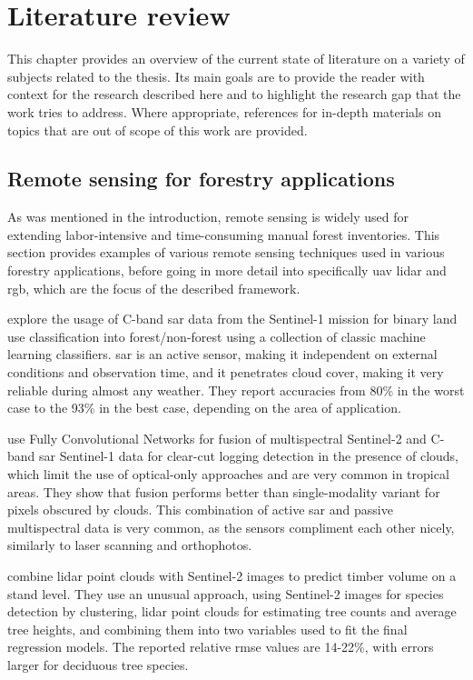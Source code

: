 \chapter{Literature review}\label{cap:literature}

This chapter provides an overview of the current state of literature on a variety of subjects related to the thesis.
Its main goals are to provide the reader with context for the research described here and to highlight the research gap that the work tries to address.
Where appropriate, references for in-depth materials on topics that are out of scope of this work are provided.

\section{Remote sensing for forestry applications}

As was mentioned in the introduction, remote sensing is widely used for extending labor-intensive and time-consuming manual forest inventories.
This section provides examples of various remote sensing techniques used in various forestry applications, before going in more detail into specifically \gls{uav} \gls{lidar} and \gls{rgb}, which are the focus of the described framework.

\citet{hansenAssessingForestNonForest2020} explore the usage of C-band \gls{sar} data from the Sentinel-1 mission for binary land use classification into forest/non-forest using a collection of classic machine learning classifiers.
\gls{sar} is an active sensor, making it independent on external conditions and observation time, and it penetrates cloud cover, making it very reliable during almost any weather.
They report accuracies from 80\% in the worst case to the 93\% in the best case, depending on the area of application.

\citet{ferrariFusingSentinel1Sentinel22023} use Fully Convolutional Networks \citep{longFullyConvolutionalNetworks2015} for fusion of multispectral Sentinel-2 and C-band \gls{sar} Sentinel-1 data for clear-cut logging detection in the presence of clouds, which limit the use of optical-only approaches and are very common in tropical areas.
They show that fusion performs better than single-modality variant for pixels obscured by clouds.
This combination of active \gls{sar} and passive multispectral data is very common, as the sensors compliment each other nicely, similarly to laser scanning and orthophotos.

\citet{sinica-sinavskisForestStandVolume2022} combine \gls{lidar} point clouds with Sentinel-2 images to predict timber volume on a stand level.
They use an unusual approach, using Sentinel-2 images for species detection by clustering, \gls{lidar} point clouds for estimating tree counts and average tree heights, and combining them into two variables used to fit the final regression models.
The reported relative \gls{rmse} values are 14-22\%, with errors larger for deciduous tree species.

